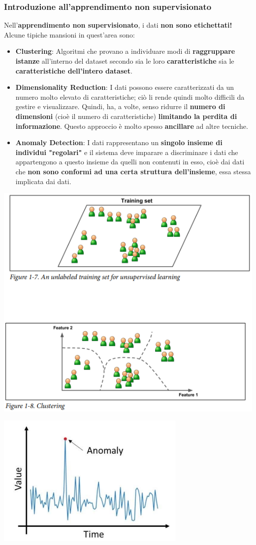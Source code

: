 \documentclass[12pt]{article}
\begin{document}
\subsubsection{Introduzione all'apprendimento non supervisionato}
Nell'\textbf{apprendimento non supervisionato}, i dati \textbf{non sono etichettati!}
Alcune tipiche mansioni in quest'area sono:
\begin{itemize}
    \item \textbf{Clustering}: Algoritmi che provano a individuare modi di \textbf{raggruppare istanze} all'interno del dataset secondo sia le loro \textbf{caratteristiche} sia le \textbf{caratteristiche dell'intero dataset}.
    \item \textbf{Dimensionality Reduction}: I dati possono essere caratterizzati da un numero molto elevato di caratteristiche; ciò li rende quindi molto difficili da gestire e visualizzare. Quindi, ha, a volte, senso ridurre il \textbf{numero di dimensioni} (cioè il numero di caratteristiche) \textbf{limitando la perdita di informazione}. Questo approccio è molto spesso \textbf{ancillare} ad altre tecniche.
    \item \textbf{Anomaly Detection}: I dati rappresentano un \textbf{singolo insieme di individui "regolari"} e il sistema deve imparare a discriminare i dati che appartengono a questo insieme da quelli non contenuti in esso, cioè dai dati che \textbf{non sono conformi ad una certa struttura dell'insieme}, essa stessa implicata dai dati.
\end{itemize}
\begin{center}
    \includegraphics[width =0.65\linewidth]{Images/61.PNG}
\end{center}
\begin{center}
    \includegraphics[width =0.50\linewidth]{Images/62.PNG}
\end{center}
\end{document}
